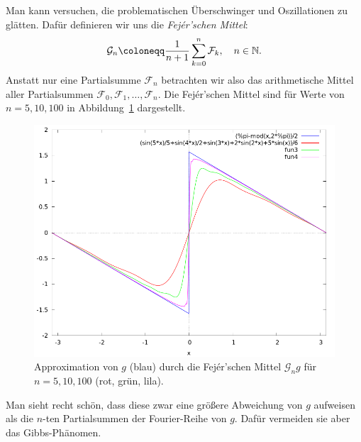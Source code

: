 \begin{example}
Man kann versuchen, die problematischen Überschwinger und Oszillationen zu glätten. Dafür definieren
wir uns die \emph{Fej\'{e}r'schen Mittel}:
\[
  \mathcal{G}_{n} \coloneqq \frac{1}{n + 1} \sum_{k = 0}^{n} \mathcal{F}_{k}, \quad n \in \N.
\]
Anstatt nur eine Partialsumme $ \mathcal{F}_{n} $ betrachten wir also das arithmetische Mittel 
aller Partialsummen $ \mathcal{F}_{0}, \mathcal{F}_{1}, \ldots, \mathcal{F}_{n} $. Die 
Fej\'{e}r'schen Mittel sind für Werte von $ n = 5, 10, 100 $ in Abbildung~\ref{fig:sawtooth_fejer}
dargestellt.
\begin{figure}[ht]
\centering
\includegraphics[width=0.5\linewidth]{Bilder/sawtooth_fejer}
\caption{Approximation von $ g $ (blau) durch die Fej\'{e}r'schen Mittel $ \mathcal{G}_{n}g $ für 
$ n = 5, 10, 100 $ (rot, grün, lila).}
\label{fig:sawtooth_fejer}
\end{figure}
Man sieht recht schön, dass diese zwar eine größere Abweichung von $ g $ aufweisen als die
$ n $-ten Partialsummen der Fourier-Reihe von $ g $. Dafür vermeiden sie aber das Gibbs-Phänomen.
\end{example}